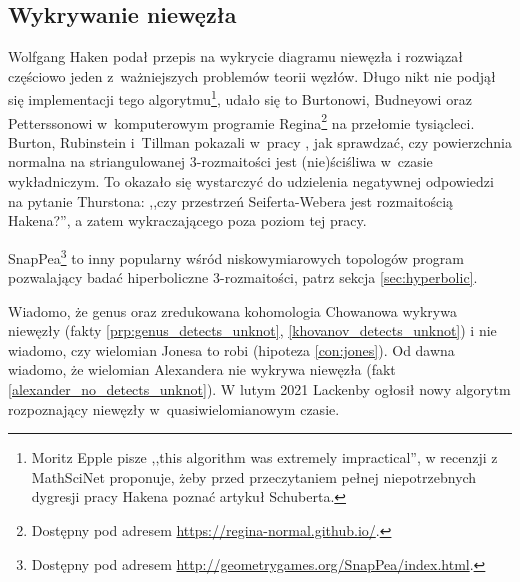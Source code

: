 
\subsection{Wykrywanie niewęzła}
Wolfgang Haken \cite{haken61} podał przepis na wykrycie diagramu niewęzła i rozwiązał częściowo jeden z~ważniejszych problemów teorii węzłów.
%
Długo nikt nie podjął się implementacji tego algorytmu\footnote{Moritz Epple pisze ,,this algorithm was extremely impractical'', w recenzji z MathSciNet proponuje, żeby przed przeczytaniem pełnej niepotrzebnych dygresji pracy Hakena poznać artykuł \cite{schubert61} Schuberta.}, udało się to Burtonowi, Budneyowi oraz Petterssonowi w~komputerowym programie Regina\footnote{Dostępny pod adresem \url{https://regina-normal.github.io/}.} na przełomie tysiącleci.
%
%
%
%
Burton, Rubinstein i~Tillman pokazali w~pracy \cite{burton12}, jak sprawdzać, czy powierzchnia normalna na striangulowanej 3-rozmaitości jest (nie)ściśliwa w~czasie wykładniczym.
%
%
To okazało się wystarczyć do udzielenia negatywnej odpowiedzi na pytanie Thurstona: ,,czy przestrzeń Seiferta-Webera jest rozmaitością Hakena?'', a zatem wykraczającego poza poziom tej pracy.
%
%
%

SnapPea\footnote{Dostępny pod adresem \url{http://geometrygames.org/SnapPea/index.html}.} to inny popularny wśród niskowymiarowych topologów program pozwalający badać hiperboliczne 3-rozmaitości, patrz sekcja \ref{sec:hyperbolic}.

Wiadomo, że genus oraz zredukowana kohomologia Chowanowa wykrywa niewęzły (fakty \ref{prp:genus_detects_unknot}, \ref{khovanov_detects_unknot}) i nie wiadomo, czy wielomian Jonesa to robi (hipoteza \ref{con:jones}).
%
%
%
Od dawna wiadomo, że wielomian Alexandera nie wykrywa niewęzła (fakt \ref{alexander_no_detects_unknot}).
%
W lutym 2021 Lackenby ogłosił nowy algorytm rozpoznający niewęzły w~quasiwielomianowym czasie.
%

